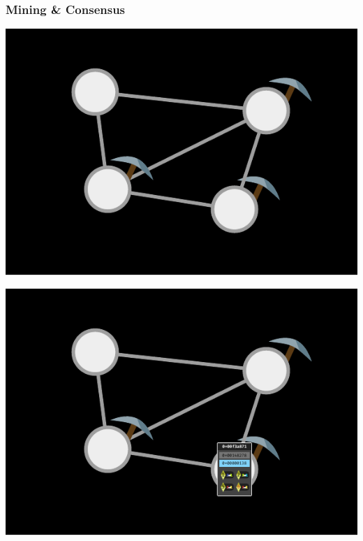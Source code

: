 \documentclass[xcolor=x11names,compress]{beamer}
\begin{document}
\begin{frame}
	\frametitle{Mining \& Consensus}

	\begin{overprint}
		\begin{center}
			\includegraphics[width=\textwidth,height=0.8\textheight,keepaspectratio]{img/mining/short/01.pdf}
		\end{center}
		\begin{center}
			\includegraphics[width=\textwidth,height=0.8\textheight,keepaspectratio]{img/mining/short/02.pdf}
		\end{center}
		\begin{center}

\end{center}
\end{overprint}
\end{frame}
\end{document}
